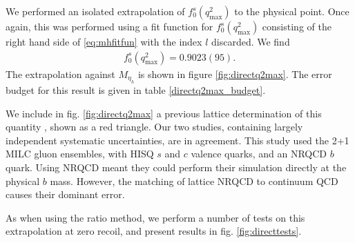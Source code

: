 We performed an isolated extrapolation of $f^s_0(q^2_{\text{max}})$ to the physical point. Once again, this was performed using a fit function for $f^s_0(q^2_{\text{max}})$ consisting of the right hand side of \eqref{eq:mhfitfun} with the index $l$ discarded. We find
\begin{align}
  f_0^s(q^2_{\text{max}}) = 0.9023(95).
  \label{eq:f0s_direct}
\end{align}
The extrapolation against $M_{\eta_h}$ is shown in figure \ref{fig:directq2max}. The error budget for this result is given in table \ref{directq2max_budget}.

We include in fig. \ref{fig:directq2max} a previous lattice determination of this quantity \cite{Monahan:2017uby}, shown as a red triangle. Our two studies, containing largely independent systematic uncertainties, are in agreement. This study used the 2+1 MILC gluon ensembles, with HISQ $s$ and $c$ valence quarks, and an NRQCD $b$ quark. Using NRQCD meant they could perform their simulation directly at the physical $b$ mass. However, the matching of lattice NRQCD to continuum QCD causes their dominant error.

As when using the ratio method, we perform a number of tests on this extrapolation at zero recoil, and present results in fig. \ref{fig:directtests}.

